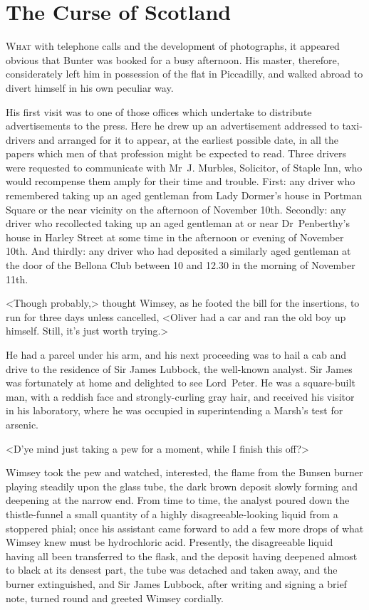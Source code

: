 \chapter{The Curse of Scotland}

\lettrine{W}{hat} with telephone calls and the development of photographs, it appeared obvious that Bunter was booked for a busy afternoon. His master, therefore, considerately left him in possession of the flat in Piccadilly, and walked abroad to divert himself in his own peculiar way.

His first visit was to one of those offices which undertake to distribute advertisements to the press. Here he drew up an advertisement addressed to taxi-drivers and arranged for it to appear, at the earliest possible date, in all the papers which men of that profession might be expected to read. Three drivers were requested to communicate with Mr~J\@. Murbles, Solicitor, of Staple Inn, who would recompense them amply for their time and trouble. First: any driver who remembered taking up an aged gentleman from Lady Dormer's house in Portman Square or the near vicinity on the afternoon of November 10th. Secondly: any driver who recollected taking up an aged gentleman at or near Dr~Penberthy's house in Harley Street at some time in the afternoon or evening of November 10th. And thirdly: any driver who had deposited a similarly aged gentleman at the door of the Bellona Club between 10 and 12.30 in the morning of November 11th.

<Though probably,> thought Wimsey, as he footed the bill for the insertions, to run for three days unless cancelled, <Oliver had a car and ran the old boy up himself. Still, it's just worth trying.>

He had a parcel under his arm, and his next proceeding was to hail a cab and drive to the residence of Sir James Lubbock, the well-known analyst. Sir James was fortunately at home and delighted to see Lord~Peter. He was a square-built man, with a reddish face and strongly-curling gray hair, and received his visitor in his laboratory, where he was occupied in superintending a Marsh's test for arsenic.

<D'ye mind just taking a pew for a moment, while I finish this off?>

Wimsey took the pew and watched, interested, the flame from the Bunsen burner playing steadily upon the glass tube, the dark brown deposit slowly forming and deepening at the narrow end. From time to time, the analyst poured down the thistle-funnel a small quantity of a highly disagreeable-looking liquid from a stoppered phial; once his assistant came forward to add a few more drops of what Wimsey knew must be hydrochloric acid. Presently, the disagreeable liquid having all been transferred to the flask, and the deposit having deepened almost to black at its densest part, the tube was detached and taken away, and the burner extinguished, and Sir James Lubbock, after writing and signing a brief note, turned round and greeted Wimsey cordially.

